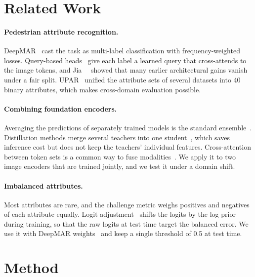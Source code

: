 \documentclass[10pt,twocolumn,letterpaper]{article}
\begin{document}
\section{Related Work}
\label{sec:related}

\paragraph{Pedestrian attribute recognition.} DeepMAR~\cite{deepmar} cast the task as multi-label classification with frequency-weighted losses. Query-based heads~\cite{q2l,mldecoder} give each label a learned query that cross-attends to the image tokens, and Jia~\etal~\cite{rethinkpar} showed that many earlier architectural gains vanish under a fair split. UPAR~\cite{upar} unified the attribute sets of several datasets into 40 binary attributes, which makes cross-domain evaluation possible.

\paragraph{Combining foundation encoders.} Averaging the predictions of separately trained models is the standard ensemble~\cite{deepens,ovadia}. Distillation methods merge several teachers into one student~\cite{amradio,prism}, which saves inference cost but does not keep the teachers' individual features. Cross-attention between token sets is a common way to fuse modalities~\cite{bottleneck}. We apply it to two image encoders that are trained jointly, and we test it under a domain shift.

\paragraph{Imbalanced attributes.} Most attributes are rare, and the challenge metric weighs positives and negatives of each attribute equally. Logit adjustment~\cite{logitadj} shifts the logits by the log prior during training, so that the raw logits at test time target the balanced error. We use it with DeepMAR weights~\cite{deepmar} and keep a single threshold of 0.5 at test time.

\section{Method}
\label{sec:method}
\end{document}
